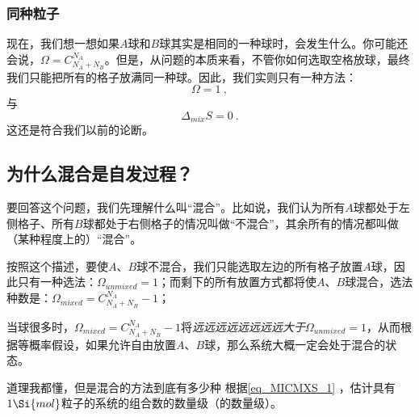 \subsubsection{同种粒子}
现在，我们想一想如果$A$球和$B$球其实是相同的一种球时，会发生什么。你可能还会说，$\Omega = C^{N_A}_{N_A+N_B}$。但是，从问题的本质来看，不管你如何选取空格放球，最终我们只能把所有的格子放满同一种球。因此，我们实则只有一种方法：
\begin{equation}
\Omega = 1~,
\end{equation}
与
\begin{equation}
\Delta_{mix} S = 0~.
\end{equation}
这还是符合我们以前的论断。

\subsection{为什么混合是自发过程？}
要回答这个问题，我们先理解什么叫“混合”。比如说，我们认为所有$A$球都处于左侧格子、所有$B$球都处于右侧格子的情况叫做“不混合”，其余所有的情况都叫做（某种程度上的）“混合”。

按照这个描述，要使$A$、$B$球不混合，我们只能选取左边的所有格子放置$A$球，因此只有一种选法：$\Omega_{unmixed} = 1$；而剩下的所有放置方式都将使$A$、$B$球混合，选法种数是：$\Omega_{mixed} =  C^{N_A}_{N_A+N_B} - 1$；

当球很多时，$\Omega_{mixed} = C^{N_A}_{N_A+N_B} - 1$将\textsl{远远远远远远远远大于}$\Omega_{unmixed} = 1$，从而根据等概率假设，如果允许自由放置$A$、$B$球，那么系统大概一定会处于混合的状态。

\begin{exercise}{道理我都懂，但是混合的方法到底有多少种}
根据\autoref{eq_MICMXS_1} ，估计具有$1 \Si{mol}$粒子的系统的组合数的数量级（的数量级）。
\end{exercise}
